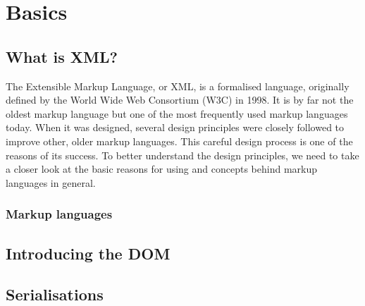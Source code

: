 \chapter{Basics}

\section{What is XML?}
\par The Extensible Markup Language, or XML, is a formalised language, originally
               defined by the World Wide Web Consortium (W3C) in 1998. It is by far not the
               oldest markup language but one of the most frequently used markup languages today. When it was designed,
               several design principles were closely followed to improve other, older markup languages. This careful
               design process is one of the reasons of its success. To better understand the design principles, we need
               to take a closer look at the basic reasons for using and concepts behind markup languages in general.
\subsection{Markup languages}

\section{Introducing the DOM}

\section{Serialisations}
